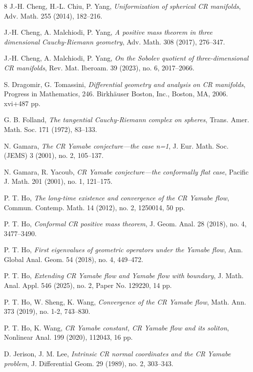 \documentclass[a4paper,12pt]{amsart}
\begin{document}
\begin{thebibliography}{8}
  J.-H. Cheng, H.-L. Chiu, P. Yang, 
 \textit{Uniformization of spherical CR manifolds}, Adv. Math. 255 (2014), 182–216.

  J.-H. Cheng, A. Malchiodi, P. Yang,
 \textit{A positive mass theorem in three dimensional Cauchy-Riemann geometry},
 Adv. Math. 308 (2017), 276–347.

  J.-H. Cheng, A. Malchiodi, P. Yang,
 \textit{On the Sobolev quotient of three-dimensional CR manifolds},
 Rev. Mat. Iberoam. 39 (2023), no. 6, 2017–2066.


   S. Dragomir, G. Tomassini,
 \textit{Differential geometry and analysis on CR manifolds}, Progress in Mathematics, 246. Birkhäuser Boston, Inc., Boston, MA, 2006. xvi+487 pp.

  G. B. Folland,
 \textit{The tangential Cauchy-Riemann complex on spheres},
 Trans. Amer. Math. Soc. 171 (1972), 83–133. 

  N. Gamara,
 \textit{The CR Yamabe conjecture—the case n=1},
 J. Eur. Math. Soc. (JEMS) 3 (2001), no. 2, 105–137.
 
  N. Gamara, R. Yacoub,
 \textit{CR Yamabe conjecture—the conformally flat case},
 Pacific J. Math. 201 (2001), no. 1, 121–175.


  P. T. Ho,
\textit{The long-time existence and convergence of the CR Yamabe flow},
 Commun. Contemp. Math. 14 (2012), no. 2, 1250014, 50 pp.

  P. T. Ho, 
  \textit{Conformal CR positive mass theorem}, J. Geom. Anal. 28 (2018), no. 4, 3477–3490.

  P. T. Ho,
 \textit{First eigenvalues of geometric operators under the Yamabe flow}, Ann. Global Anal. Geom. 54 (2018), no. 4, 449–472.

  P. T. Ho,
 \textit{Extending CR Yamabe flow and Yamabe flow with boundary}, J. Math. Anal. Appl. 546 (2025), no. 2, Paper No. 129220, 14 pp.

  P. T. Ho, W. Sheng, K. Wang,
\textit{Convergence of the CR Yamabe flow},
Math. Ann. 373 (2019), no. 1-2, 743–830. 

P. T. Ho, K. Wang, \textit{CR Yamabe constant, CR Yamabe flow and its soliton}, Nonlinear Anal. 199 (2020), 112043, 16 pp.

   D. Jerison, J. M. Lee,
 \textit{Intrinsic CR normal coordinates and the CR Yamabe problem},
 J. Differential Geom. 29 (1989), no. 2, 303–343.


\end{thebibliography}
\end{document}
